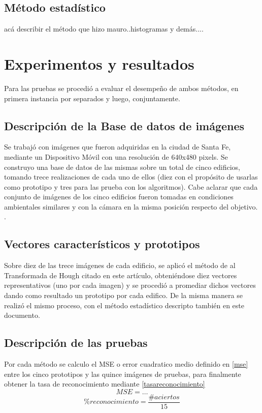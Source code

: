 \documentclass[conference,spanish,a4paper,10pt,oneside,final]{tfmpd}
\begin{document}
\subsection*{Método estadístico}
acá describir el método que hizo mauro..histogramas y demás....
\section{Experimentos y resultados}
Para las pruebas se procedió a evaluar el desempeño de ambos métodos, en primera instancia por separados y luego, conjuntamente.
\subsection{Descripción de la Base de datos de imágenes}
Se trabajó con imágenes que fueron adquiridas en la ciudad de Santa Fe, mediante un Dispositivo Móvil con una resolución de 640x480 pixels. Se construyo una base de datos de las mismas sobre un total de cinco edificios, tomando trece realizaciones de cada uno de ellos (diez con el propósito de usarlas como prototipo y tres para las prueba con los algoritmos). Cabe aclarar que cada conjunto de imágenes de los cinco edificios fueron tomadas en condiciones ambientales similares y con la cámara en la misma posición respecto del objetivo. .
\subsection{Vectores característicos y prototipos}
Sobre diez de las trece imágenes de cada edificio, se aplicó el método de al Transformada de Hough citado en este artículo, obteniéndose diez vectores representativos (uno por cada imagen) y se procedió a promediar dichos vectores dando como resultado un prototipo por cada edifico. De la misma manera se realizó el mismo proceso, con el método estadístico descripto también en este documento.
\subsection{Descripción de las pruebas}
Por cada método se calculo el MSE o error cuadratico medio definido en \ref{mse} entre los cinco prototipos y las quince imágenes de pruebas, para finalmente obtener la tasa de reconocimiento mediante \ref{tasareconocimiento}
\begin{equation}
MSE=\ldots \label{mse}
\end{equation}
\begin{equation}
\% reconocimiento = \frac{\# aciertos}{15} \label{tasareconocimiento}
\end{equation}
%
%
%
%
\end{document}
